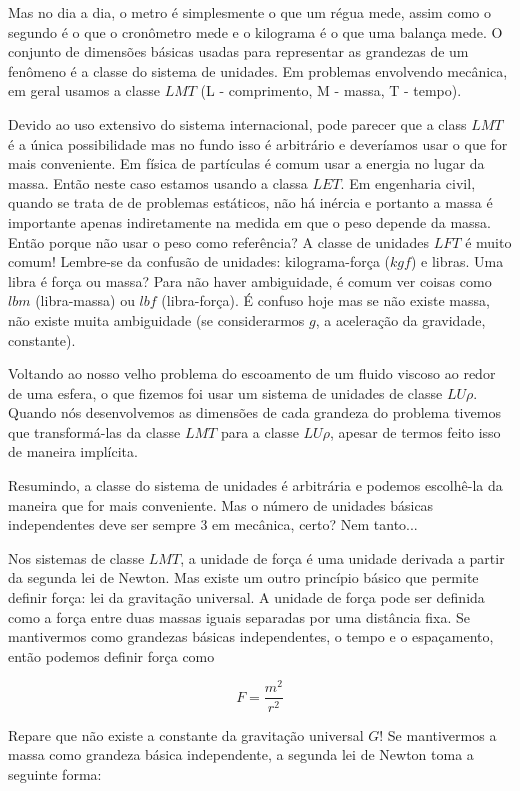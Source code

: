 Mas no dia a dia, o metro é simplesmente o que um régua mede, assim como o segundo é o que o cronômetro mede e o kilograma é o que uma balança mede. O conjunto de dimensões básicas usadas para representar as grandezas de um fenômeno é a classe do sistema de unidades. Em problemas envolvendo mecânica, em geral usamos a classe $LMT$ (L - comprimento, M - massa, T - tempo).

Devido ao uso extensivo do sistema internacional, pode parecer que a class $LMT$ é a única possibilidade mas no fundo isso é arbitrário e deveríamos usar o que for mais conveniente. Em física de partículas é comum usar a energia no lugar da massa. Então neste caso estamos usando a classa $LET$. Em engenharia civil, quando se trata de de problemas estáticos, não há inércia e portanto a massa é importante apenas indiretamente na medida em que o peso depende da massa. Então porque não usar o peso como referência? A classe de unidades $LFT$ é muito comum! Lembre-se da confusão de unidades: kilograma-força ($kgf$) e libras. Uma libra é força ou massa? Para não haver ambiguidade, é comum ver coisas como $lbm$ (libra-massa) ou $lbf$ (libra-força). É confuso hoje mas se não existe massa, não existe muita ambiguidade (se considerarmos $g$, a aceleração da gravidade, constante).

Voltando ao nosso velho problema do escoamento de um fluido viscoso ao redor de uma esfera, o que fizemos foi usar um sistema de unidades de classe $LU\rho$. Quando nós desenvolvemos as dimensões de cada grandeza do problema tivemos que transformá-las da classe $LMT$ para a classe $LU\rho$, apesar de termos feito isso de maneira implícita.

Resumindo, a classe do sistema de unidades é arbitrária e podemos escolhê-la da maneira que for mais conveniente. Mas o número de unidades básicas independentes deve  ser sempre 3 em mecânica, certo? Nem tanto...

Nos sistemas de classe $LMT$, a unidade de força é uma unidade derivada a partir da segunda lei de Newton. Mas existe um outro princípio básico que permite definir força: lei da gravitação universal. A unidade de força pode ser definida como a força entre duas massas iguais separadas por uma distância fixa. Se mantivermos como grandezas básicas independentes, o tempo e o espaçamento, então podemos definir força como

\[
F = \frac{m^2}{r^2}
\]

Repare que não existe a constante da gravitação universal $G$! Se mantivermos a massa como grandeza básica independente, a segunda lei de Newton toma a seguinte forma:

